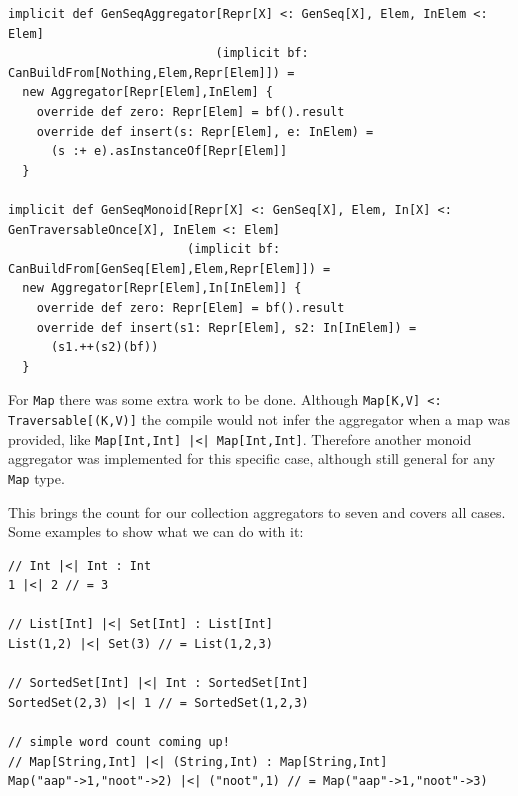 \documentclass[10pt,a4paper]{article}
\begin{document}
\begin{lstlisting}[float,frame=tb,caption=Aggregators for sequences,label=lst:seq-aggregators]
implicit def GenSeqAggregator[Repr[X] <: GenSeq[X], Elem, InElem <: Elem]
                             (implicit bf: CanBuildFrom[Nothing,Elem,Repr[Elem]]) =
  new Aggregator[Repr[Elem],InElem] {
    override def zero: Repr[Elem] = bf().result
    override def insert(s: Repr[Elem], e: InElem) =
      (s :+ e).asInstanceOf[Repr[Elem]]
  }

implicit def GenSeqMonoid[Repr[X] <: GenSeq[X], Elem, In[X] <: GenTraversableOnce[X], InElem <: Elem]
                         (implicit bf: CanBuildFrom[GenSeq[Elem],Elem,Repr[Elem]]) =
  new Aggregator[Repr[Elem],In[InElem]] {
    override def zero: Repr[Elem] = bf().result
    override def insert(s1: Repr[Elem], s2: In[InElem]) =
      (s1.++(s2)(bf))
  }
\end{lstlisting}

For \lstinline|Map| there was some extra work to be done. Although \lstinline|Map[K,V] <: Traversable[(K,V)]| the compile would not infer the aggregator when a map was provided, like \lstinline!Map[Int,Int] |<| Map[Int,Int]!. Therefore another monoid aggregator was implemented for this specific case, although still general for any \lstinline|Map| type.

This brings the count for our collection aggregators to seven and covers all cases. Some examples to show what we can do with it:
\begin{lstlisting}
// Int |<| Int : Int
1 |<| 2 // = 3

// List[Int] |<| Set[Int] : List[Int]
List(1,2) |<| Set(3) // = List(1,2,3)

// SortedSet[Int] |<| Int : SortedSet[Int]
SortedSet(2,3) |<| 1 // = SortedSet(1,2,3)

// simple word count coming up!
// Map[String,Int] |<| (String,Int) : Map[String,Int]
Map("aap"->1,"noot"->2) |<| ("noot",1) // = Map("aap"->1,"noot"->3)
\end{lstlisting}
\end{document}
